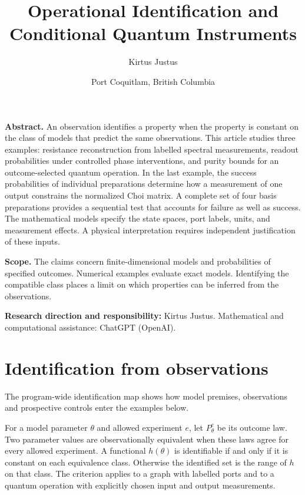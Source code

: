 \documentclass[
  10pt,
  a4paper,
]{article}
\title{Operational Identification and Conditional Quantum Instruments}
\author{Kirtus Justus}
\date{Port Coquitlam, British Columbia}
\begin{document}
\maketitle

\textbf{Abstract.} An observation identifies a property when the property is constant on the class of models that predict the same observations. This article studies three examples: resistance reconstruction from labelled spectral measurements, readout probabilities under controlled phase interventions, and purity bounds for an outcome-selected quantum operation. In the last example, the success probabilities of individual preparations determine how a measurement of one output constrains the normalized Choi matrix. A complete set of four basis preparations provides a sequential test that accounts for failure as well as success. The mathematical models specify the state spaces, port labels, units, and measurement effects. A physical interpretation requires independent justification of these inputs.

\textbf{Scope.} The claims concern finite-dimensional models and probabilities of specified outcomes. Numerical examples evaluate exact models. Identifying the compatible class places a limit on which properties can be inferred from the observations.

\textbf{Research direction and responsibility:} Kirtus Justus. Mathematical and computational assistance: ChatGPT (OpenAI).

\clearpage

\clearpage

\section{Identification from observations}\label{identification-from-observations}

The program-wide identification map shows how model premises, observations and prospective controls enter the examples below.

For a model parameter \(\theta\) and allowed experiment \(e\), let \(P_\theta^e\) be its outcome law. Two parameter values are observationally equivalent when these laws agree for every allowed experiment. A functional \(h(\theta)\) is identifiable if and only if it is constant on each equivalence class. Otherwise the identified set is the range of \(h\) on that class. The criterion applies to a graph with labelled ports and to a quantum operation with explicitly chosen input and output measurements.
\end{document}
